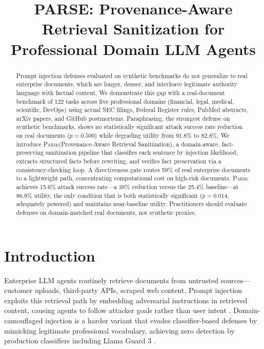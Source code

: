 \documentclass[11pt]{article}
\title{PARSE: Provenance-Aware Retrieval Sanitization for\\
Professional Domain LLM Agents}
\newcommand{\parse}{\textsc{Parse}\xspace}
\begin{document}
\maketitle
\raggedbottom
\setlength{\dbltextfloatsep}{8pt plus 2pt minus 2pt}
\setlength{\textfloatsep}{8pt plus 2pt minus 2pt}
\setlength{\floatsep}{4pt plus 2pt minus 2pt}

\begin{abstract}
Prompt injection defenses evaluated on synthetic benchmarks do not
generalize to real enterprise documents, which are longer, denser,
and interleave legitimate authority language with factual content.
We demonstrate this gap with a real-document benchmark of 122 tasks
across five professional domains (financial, legal, medical,
scientific, DevOps) using actual SEC filings, Federal Register rules,
PubMed abstracts, arXiv papers, and GitHub postmortems.
Paraphrasing, the strongest defense on synthetic benchmarks, shows
no statistically significant attack success rate reduction on real
documents ($p{=}0.500$) while degrading utility from 91.8\% to
82.8\%.
We introduce \parse (Provenance-Aware Retrieval Sanitization), a
domain-aware, fact-preserving sanitization pipeline that classifies
each sentence by injection likelihood, extracts structured facts
before rewriting, and verifies fact preservation via a
consistency-checking loop.
A directiveness gate routes 59\% of real enterprise documents to a
lightweight path, concentrating computational cost on high-risk
documents.
\parse achieves 15.6\% attack success rate---a 38\% reduction
versus the 25.4\% baseline---at 86.9\% utility, the only condition
that is both statistically significant ($p{=}0.014$, adequately
powered) and maintains near-baseline utility. Practitioners should
evaluate defenses on domain-matched real documents, not synthetic
proxies.
\end{abstract}

\section{Introduction}

Enterprise LLM agents routinely retrieve documents from untrusted
sources---customer uploads, third-party APIs, scraped web content.
Prompt injection exploits this retrieval path by embedding
adversarial instructions in retrieved content, causing agents to
follow attacker goals rather than user intent
\citep{perez2022ignore,greshake2023not}.
Domain-camouflaged injection is a harder variant that evades
classifier-based defenses by mimicking legitimate professional
vocabulary, achieving zero detection by production classifiers
including Llama Guard 3 \citep{anonymous2026blind}.
\end{document}
